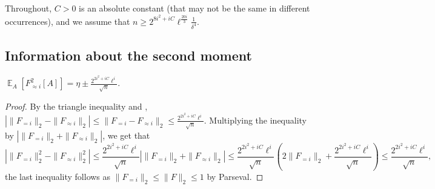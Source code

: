 \documentclass{toc}
\newcommand\card[1]{\left| {#1} \right|}
\newcommand\Expect[2]{{\mathop{\mathbb{E}}_{#1}\left[ {#2} \right]}}
\newcommand\norm[1]{\| #1 \|}
\renewcommand\geq{\geqslant}
\renewcommand\leq{\leqslant}
\newcommand\lvlfn[2]{{#1}_{={#2}}}
\newcommand\approxlvlfn[2]{{#1}_{\approx{#2}}}
\begin{document}
Throughout, $C>0$ is an absolute constant (that may not be the same in different occurrences), %
and we assume that
$n\geq 2^{8i^2+iC}\ell^{\frac{20i}{3}}\frac{1}{\delta^4}$.

\subsection{Information about the second moment}
\begin{claim}
$\Expect{A}{\approxlvlfn{F}{i}^2[A]} = \eta \pm \frac{2^{2i^2+iC} \ell^{i}}{\sqrt{n}}$.
\end{claim}
\begin{proof}
By the triangle inequality and ,
$\card{\norm{
\lvlfn{F}{i}}_2
-\norm{\approxlvlfn{F}{i}}_2}
\leq
\norm{\lvlfn{F}{i}-\approxlvlfn{F}{i}}_2
\leq \frac{2^{2i^2+iC} \ell^{i}}{\sqrt{n}}$.
Multiplying the inequality by
$\card{\norm{\lvlfn{F}{i}}_2+\norm{\approxlvlfn{F}{i}}_2}$, we get that
\[
\card{\norm{
\lvlfn{F}{i}}_2^2
-\norm{\approxlvlfn{F}{i}}_2^2}
\leq \frac{2^{2i^2+iC} \ell^{i}}{\sqrt{n}}
\card{\norm{\lvlfn{F}{i}}_2+\norm{\approxlvlfn{F}{i}}_2}
\leq \frac{2^{2i^2+iC} \ell^{i}}{\sqrt{n}}
\left(2\norm{\lvlfn{F}{i}}_2+\frac{2^{2i^2+iC} \ell^{i}}{\sqrt{n}}\right)
\leq \frac{2^{2i^2+iC} \ell^{i}}{\sqrt{n}},
\]
the last inequality follows as $\norm{\lvlfn{F}{i}}_2\leq \norm{F}_2 \leq 1$ by Parseval.
\end{proof}
\end{document}
